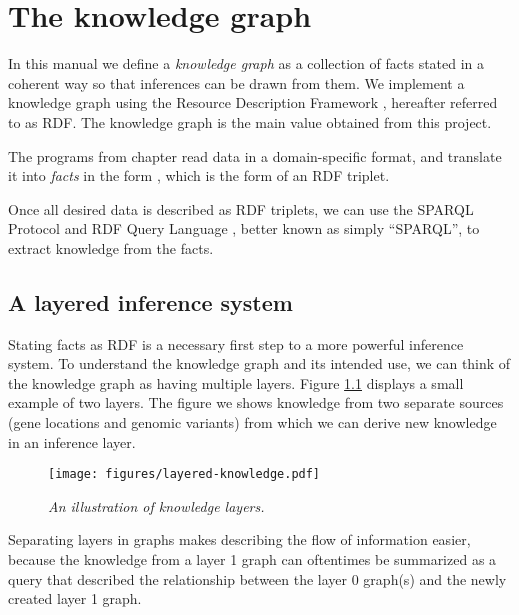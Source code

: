 \chapter{The knowledge graph}
\label{chap:knowledge-graph}

  In this manual we define a \emph{knowledge graph} as a collection of
  facts stated in a coherent way so that inferences can be drawn from
  them.  We implement a knowledge graph using the Resource Description
  Framework \citep{Lassila-99-RDF}, hereafter referred to as RDF.  The
  knowledge graph is the main value obtained from this project.

  The programs from chapter  read data in a
  domain-specific format, and translate it into \emph{facts} in the form
  , which is the form of an RDF triplet.

  Once all desired data is described as RDF triplets, we can use the SPARQL
  Protocol and RDF Query Language \citep{sparql-11}, better known as simply
  ``SPARQL'', to extract knowledge from the facts.

\section{A layered inference system}

  Stating facts as RDF is a necessary first step to a more powerful inference
  system.  To understand the knowledge graph and its intended use, we can
  think of the knowledge graph as having multiple layers.  Figure
  \ref{fig:layered-knowledge} displays a small example of two layers.  The
  figure we shows knowledge from two separate sources (gene locations and
  genomic variants) from which we can derive new knowledge in an inference
  layer.

  \begin{figure}[H]
    \begin{center}
    \texttt{[image: figures/layered-knowledge.pdf]}
    \end{center}
    \caption{\textit{An illustration of knowledge layers.}}
    \label{fig:layered-knowledge}
  \end{figure}

  Separating layers in graphs makes describing the flow of information easier,
  because the knowledge from a layer 1 graph can oftentimes be summarized as a
  query that described the relationship between the layer 0 graph(s) and the
  newly created layer 1 graph.

